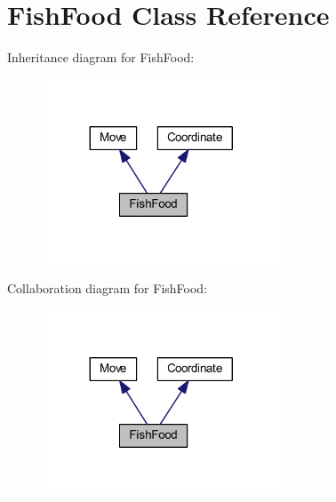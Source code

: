 \hypertarget{class_fish_food}{}\section{Fish\+Food Class Reference}
\label{class_fish_food}


Inheritance diagram for Fish\+Food\+:
\nopagebreak
\begin{figure}[H]
\begin{center}
\leavevmode
\includegraphics[width=200pt]{class_fish_food__inherit__graph}
\end{center}
\end{figure}


Collaboration diagram for Fish\+Food\+:
\nopagebreak
\begin{figure}[H]
\begin{center}
\leavevmode
\includegraphics[width=200pt]{class_fish_food__coll__graph}
\end{center}
\end{figure}
